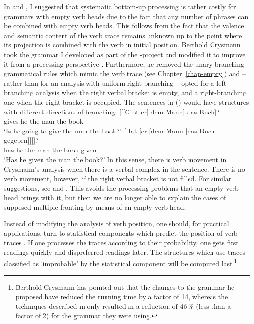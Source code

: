 \begin{exe}
\begin{xlist}
In  and , I suggested that systematic bottom-up
processing is rather costly for grammars with empty verb heads due to the fact that any number of phrases
can be combined with empty verb heads. This follows from the fact that the valence and semantic content of
the verb trace remains unknown up to the point where its projection is combined with the verb in initial
position.
Berthold Crysmann took the grammar I developed as part of the \verbmobil-project \citep{MK2000a} and modified
it to improve it from a processing perspective \citep{Crysmann2003b}. Furthermore, he removed the unary-branching grammatical rules
which mimic the verb trace (see Chapter~\ref{chap-empty}) and -- rather than for an analysis with uniform right-branching -- opted for a left-branching 
analysis when the right verbal bracket is empty, and a right-branching one when the right bracket is occupied. The sentences in  
() would have structures with different directions of branching:
\eal
\ex 
\gll {}[[[Gibt er] dem Mann] das Buch]?\\
      \hspaceThis{[[[}gives he the man the book\\
\glt `Is he going to give the man the book?'
\ex 
\gll {}[Hat [er [dem Mann [das Buch gegeben]]]]?\\
     \spacebr{}has \spacebr{}he \spacebr{}the man \spacebr{}the book given\\
\glt `Has he given the man the book?'
\zl
In this sense, there is verb movement in Crysmann's analysis when there is a verbal complex in the sentence.
There is no verb movement, however, if the right verbal bracket is not filled. For similar suggestions, see
 and . This avoids the processing problems that
an empty verb head brings with it, but then we are no longer able to explain the cases of supposed
multiple fronting by means of an empty verb head.

Instead of modifying the analysis of verb position, one should, for practical applications, turn to statistical components 
which predict the position of verb traces \citep{BFGKKN96a,FBCKS2003a}. If one processes the traces according
to their probability, one gets first readings quickly and dispreferred readings later. The structures which use traces
classified as `improbable' by the statistical component will be computed last.\footnote{%
	Berthold Crysmann has pointed out that the changes to the grammar he proposed
	have reduced the running time by a factor of 14, whereas the techniques described
	in  only resulted in a reduction of 46\,\% (less than a factor of 2)
	for the grammar they were using.

}
\end{xlist}
\end{exe}
